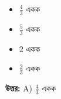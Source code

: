 \documentclass[12pt, a4paper]{article}
\begin{document}
\begin{itemize}[label={}, leftmargin=1cm, itemsep=0.5em]
    \item[\textbf{A)}] $\frac{4}{3}$ একক
    \item[\textbf{B)}] $\frac{5}{3}$ একক
    \item[\textbf{C)}] $2$ একক
    \item[\textbf{D)}] $\frac{2}{3}$ একক
\end{itemize}

\vspace{0.5em}
\begin{tcolorbox}[answerbox]
    \textbf{\color{success} উত্তর:} A) $\frac{4}{3}$ একক
\end{tcolorbox}
\vspace{1em}
\end{document}
